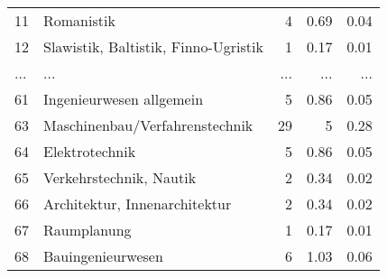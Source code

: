 \begin{longtable}{lXrrr}
        11 & \multicolumn{1}{X}{Romanistik} & %
          \num{4} &
          \num[round-mode=places,round-precision=2]{0.69} &
          \num[round-mode=places,round-precision=2]{0.04} \\
        12 & \multicolumn{1}{X}{Slawistik, Baltistik, Finno-Ugristik} & %
          \num{1} &
          \num[round-mode=places,round-precision=2]{0.17} &
          \num[round-mode=places,round-precision=2]{0.01} \\
       ... & ... & ... & ... & ... \\
        61 & \multicolumn{1}{X}{Ingenieurwesen allgemein} & %
          \num{5} &
          \num[round-mode=places,round-precision=2]{0.86} &
          \num[round-mode=places,round-precision=2]{0.05} \\

        63 & \multicolumn{1}{X}{Maschinenbau/Verfahrenstechnik} & %
          \num{29} &
          \num[round-mode=places,round-precision=2]{5} &
          \num[round-mode=places,round-precision=2]{0.28} \\

        64 & \multicolumn{1}{X}{Elektrotechnik} & %
          \num{5} &
          \num[round-mode=places,round-precision=2]{0.86} &
          \num[round-mode=places,round-precision=2]{0.05} \\

        65 & \multicolumn{1}{X}{Verkehrstechnik, Nautik} & %
          \num{2} &
          \num[round-mode=places,round-precision=2]{0.34} &
          \num[round-mode=places,round-precision=2]{0.02} \\

        66 & \multicolumn{1}{X}{Architektur, Innenarchitektur} & %
          \num{2} &
          \num[round-mode=places,round-precision=2]{0.34} &
          \num[round-mode=places,round-precision=2]{0.02} \\

        67 & \multicolumn{1}{X}{Raumplanung} & %
          \num{1} &
          \num[round-mode=places,round-precision=2]{0.17} &
          \num[round-mode=places,round-precision=2]{0.01} \\

        68 & \multicolumn{1}{X}{Bauingenieurwesen} & %
          \num{6} &
          \num[round-mode=places,round-precision=2]{1.03} &
          \num[round-mode=places,round-precision=2]{0.06} \\


\end{longtable}

